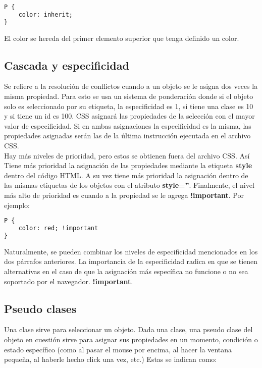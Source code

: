 \documentclass[10pt,oneside]{article}
\begin{document}
\begin{multicols}{2}
    \begin{lstlisting}[language=HTML]
P {
    color: inherit;
}
    \end{lstlisting}

    El color se hereda del primer elemento superior que tenga definido un color.

\subsection{Cascada y especificidad}

    Se refiere a la resolución de conflictos cuando a un objeto se le asigna dos veces la misma propiedad. Para esto se usa un sistema de ponderación donde si el objeto solo es seleccionado por su etiqueta, la especificidad es 1, si tiene una clase es 10 y si tiene un id es 100. CSS asignará las propiedades de la selección con el mayor valor de especificidad. Si en ambas asignaciones la especificidad es la misma, las propiedades asignadas serán las de la última instrucción ejecutada en el archivo CSS. \\ \newline Hay más niveles de prioridad, pero estos se obtienen fuera del archivo CSS. Así Tiene más prioridad la asignación de las propiedades mediante la etiqueta \textbf{style} dentro del código HTML. A su vez tiene más prioridad la asignación dentro de las mismas etiquetas de los objetos con el atributo \textbf{style=''}. Finalmente, el nivel más alto de prioridad es cuando a la propiedad se le agrega \textbf{!important}. Por ejemplo:

    \begin{lstlisting}[language=HTML]
P {
    color: red; !important
}        
    \end{lstlisting}

    Naturalmente, se pueden combinar los niveles de especificidad mencionados en los dos párrafos anteriores. La importancia de la especificidad radica en que se tienen alternativas en el caso de que la asignación más específica no funcione o no sea soportado por el navegador. \textbf{!important}.

\subsection{Pseudo clases}

    Una clase sirve para seleccionar un objeto. Dada una clase, una pseudo clase del objeto en cuestión sirve para asignar sus propiedades en un momento, condición o estado específico (como al pasar el mouse por encima, al hacer la ventana pequeña, al haberle hecho click una vez, etc.) Estas se indican como:


\end{multicols}
\end{document}
